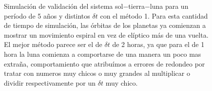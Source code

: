 \begin{figure}
{	\label{fig:ej1_m1_1825_12}
	}
	\caption{
		Simulación de validación del sistema sol$-$tierra$-$luna para un período de 5 años y distintos $\delta t$
		con el método 1.
		Para esta cantidad de tiempo de simulación, las órbitas de los planetas ya comienzan a mostrar un movimiento espiral en vez de elíptico más de una vuelta.
		El mejor método parece ser el de $\delta t$ de 2 horas, ya que para el de 1 hora la luna comienza a comportarse de una manera un poco mas extraña,
		comportamiento que atribuímos a errores de redondeo por tratar con numeros muy chicos o muy grandes al multiplicar o dividir respectivamente por un $\delta t$ muy chico.
	}
	\label{ fig:res_ej1_m1_1825 }
\end{figure}
